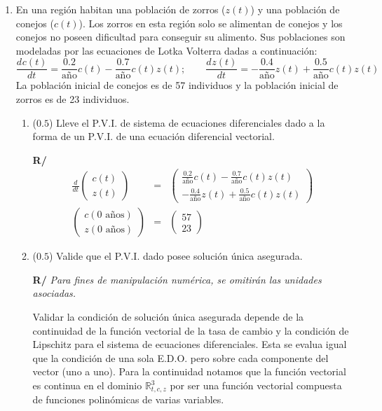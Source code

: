 \documentclass[12pt]{article}
\newcommand{\R}{\ensuremath{\mathbb{R}}}
\newcommand{\diff}[3]{\frac{d^{#3} #1}{d#2^{#3}}}
\begin{document}
\begin{enumerate}[leftmargin=*,widest=9]
    \item En una región habitan una población de zorros (\(z(t)\)) y una población de conejos (\(c(t)\)). Los zorros en esta región solo se alimentan de conejos y los conejos no poseen dificultad para conseguir su alimento.
    Sus poblaciones son modeladas por las ecuaciones de Lotka Volterra dadas a continuación:
    \[
\diff{c(t)}{t}{} = \frac{0.2}{\text{año}} c(t) - \frac{0.7}{\text{año}} c(t) z(t);\qquad
\diff{z(t)}{t}{} = -\frac{0.4}{\text{año}} z(t) + \frac{0.5}{\text{año}} c(t) z(t)
    \]
    La población inicial de conejos es de 57 individuos y la población inicial de zorros es de 23 individuos.
    \begin{enumerate}[label=\alph*]
    \item (\(0.5\)) Lleve el P.V.I. de sistema de ecuaciones diferenciales dado a la forma de un P.V.I. de una ecuación diferencial vectorial.

\textbf{R/}
    \begin{eqnarray*}
    \diff{}{t}{}\begin{pmatrix} c(t) \\ z(t)
    \end{pmatrix} &=& \begin{pmatrix} \frac{0.2}{\text{año}} c(t) - \frac{0.7}{\text{año}} c(t) z(t) \\ -\frac{0.4}{\text{año}} z(t) + \frac{0.5}{\text{año}} c(t) z(t)
    \end{pmatrix} \\
    \begin{pmatrix} c(0 \text{ años}) \\ z(0 \text{ años})
    \end{pmatrix} &=& \begin{pmatrix} 57 \\ 23 \end{pmatrix}
    \end{eqnarray*}

    \item (\(0.5\)) Valide que el P.V.I. dado posee solución única asegurada.

    \textbf{R/} \textit{Para fines de manipulación numérica, se omitirán las unidades asociadas.}

    Validar la condición de solución única asegurada depende de la continuidad de la función vectorial de la tasa de cambio y la condición de Lipschitz para el sistema de ecuaciones diferenciales. Esta se evalua igual que la condición de una sola E.D.O. pero sobre cada componente del vector (uno a uno). Para la continuidad notamos que la función vectorial es continua en el dominio \(\R^3_{t,c,z}\) por ser una función vectorial compuesta de funciones polinómicas de varias variables.


\end{enumerate}
\end{enumerate}
\end{document}
